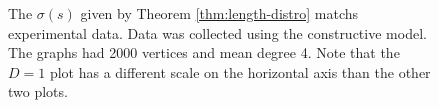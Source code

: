 \documentclass[a4paper,10pt]{article}
\begin{document}
\begin{figure}
 \centering
 \hspace{.5cm}
 \hspace{.5cm}
 \caption{The $\sigma(s)$ given by Theorem \ref{thm:length-distro} matchs experimental data. Data was collected using the constructive model. The graphs had 2000 vertices and mean degree 4. Note that the $D = 1$ plot has a different scale on the horizontal axis than the other two plots.}
\end{figure}
\end{document}
